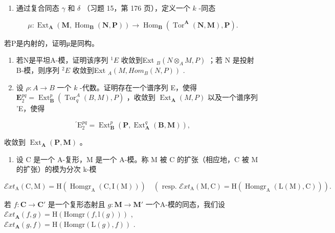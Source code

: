 \begin{enumerate}
\def\labelenumi{\alph{enumi})}
\setcounter{enumi}{1}
\tightlist
\item
  通过复合同态 \(\gamma\) 和 \(\delta\) （习题 15，第 176 页），定义一个 \(k\) -同态
\end{enumerate}

\[
\mu : \operatorname{Ext} _ {\mathbf {A}} (\mathbf {M}, \operatorname{Hom} _ {\mathbf {B}} (\mathbf {N}, \mathbf {P})) \rightarrow \operatorname{Hom} _ {\mathbf {B}} \left(\operatorname{Tor} ^ {\mathbf {A}} (\mathbf {N}, \mathbf {M}), \mathbf {P}\right).
\]

若P是内射的，证明μ是同构。

\begin{enumerate}
\def\labelenumi{\alph{enumi})}
\setcounter{enumi}{2}
\item
  若N是平坦A-模，证明该序列 \({}^{1}E\) 收敛到Ext \(_{B}(N \otimes_{A} M, P)\) ；若 N 是投射 B-模，则序列 \({}^{2}E\) 收敛到Ext \(_{A}(M, Hom_{B}(N, P))\) .
\item
  设 \(\rho: A \to B\) 一个 \(k\) -代数。证明存在一个谱序列 E，使得 \(\mathbf{E}_2^{pq} = \operatorname{Ext}_{\mathbf{B}}^p (\operatorname{Tor}_q^A(B, M), P)\) ，收敛到 \(\operatorname{Ext}_{\mathbf{A}}(M, P)\) 以及一个谱序列 'E，使得
\end{enumerate}

\[
{ } ^ { \prime } \mathrm{E} _ { 2 } ^ { p q } = \operatorname{Ext} _ { \mathbf { B } } ^ { p } ( \mathbf { P } , \operatorname{Ext} _ { \mathbf { A } } ^ { q } ( \mathbf { B } , \mathbf { M } ) ) ,
\]

收敛到 \(\operatorname{Ext}_{\mathbf{A}}(\mathbf{P}, \mathbf{M})\) 。

\begin{enumerate}
\def\labelenumi{\arabic{enumi})}
\setcounter{enumi}{6}
\tightlist
\item
  设 C 是一个 A-复形，M 是一个 A-模。称 M 被 C 的扩张（相应地，C 被 M 的扩张）的模为分次 k-模
\end{enumerate}

\[
\mathcal {E} x t _ {\mathrm{A}} (\mathrm{C}, \mathrm{M}) = \mathrm{H} (\operatorname{Homgr} _ {\mathrm{A}} (\mathrm{C}, \mathrm{I} (\mathrm{M}))) \quad \left(\text { resp. } \mathcal {E} x t _ {\mathrm{A}} (\mathrm{M}, \mathrm{C}) = \mathrm{H} (\operatorname{Homgr} _ {\mathrm{A}} (\mathrm{L} (\mathrm{M}), \mathrm{C}))\right).
\]

若 \(f: \mathbf{C} \to \mathbf{C}'\) 是一个复形态射且 \(g: \mathbf{M} \to \mathbf{M}'\) 一个A-模的同态，我们设 \(\mathcal{E}xt_{\mathbf{A}}(f, g) = \mathrm{H}(\mathrm{Homgr}(f, \mathrm{l}(g)))\) , \(\mathcal{E}xt_{\mathbf{A}}(g, f) = \mathrm{H}(\mathrm{Homgr}(\mathrm{L}(g), f))\) .

